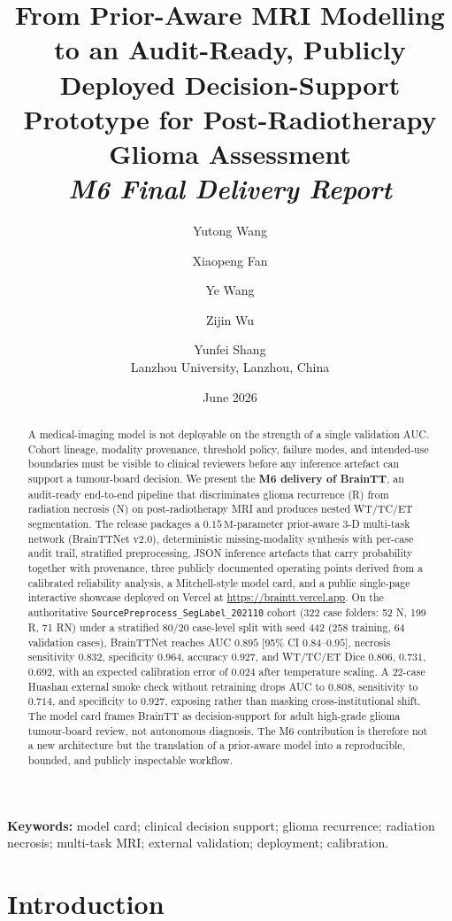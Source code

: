 \documentclass[11pt,a4paper]{article}
\title{\textbf{From Prior-Aware MRI Modelling to an Audit-Ready, Publicly Deployed Decision-Support Prototype for Post-Radiotherapy Glioma Assessment}\\[2pt]
\large\textit{M6 Final Delivery Report}}
\author{Yutong Wang \and Xiaopeng Fan \and Ye Wang \and Zijin Wu \and Yunfei Shang \\[2pt]
\small Lanzhou University, Lanzhou, China}
\date{June 2026}
\begin{document}
\maketitle

\begin{abstract}
\noindent A medical-imaging model is not deployable on the strength of a single validation AUC. Cohort lineage, modality provenance, threshold policy, failure modes, and intended-use boundaries must be visible to clinical reviewers before any inference artefact can support a tumour-board decision. We present the \textbf{M6 delivery of BrainTT}, an audit-ready end-to-end pipeline that discriminates glioma recurrence (R) from radiation necrosis (N) on post-radiotherapy MRI and produces nested WT/TC/ET segmentation. The release packages a $0.15\,\text{M}$-parameter prior-aware 3-D multi-task network (BrainTTNet v2.0), deterministic missing-modality synthesis with per-case audit trail, stratified preprocessing, JSON inference artefacts that carry probability together with provenance, three publicly documented operating points derived from a calibrated reliability analysis, a Mitchell-style model card, and a public single-page interactive showcase deployed on Vercel at \url{https://braintt.vercel.app}. On the authoritative \texttt{SourcePreprocess\_SegLabel\_202110} cohort (322 case folders: 52 N, 199 R, 71 RN) under a stratified 80/20 case-level split with seed 442 (258 training, 64 validation cases), BrainTTNet reaches AUC $0.895$ [95\% CI $0.84\text{--}0.95$], necrosis sensitivity $0.832$, specificity $0.964$, accuracy $0.927$, and WT/TC/ET Dice $0.806$, $0.731$, $0.692$, with an expected calibration error of $0.024$ after temperature scaling. A 22-case Huashan external smoke check without retraining drops AUC to $0.808$, sensitivity to $0.714$, and specificity to $0.927$, exposing rather than masking cross-institutional shift. The model card frames BrainTT as decision-support for adult high-grade glioma tumour-board review, not autonomous diagnosis. The M6 contribution is therefore not a new architecture but the translation of a prior-aware model into a reproducible, bounded, and publicly inspectable workflow.
\end{abstract}

\noindent\textbf{Keywords:} model card; clinical decision support; glioma recurrence; radiation necrosis; multi-task MRI; external validation; deployment; calibration.

\section{Introduction}
\end{document}

